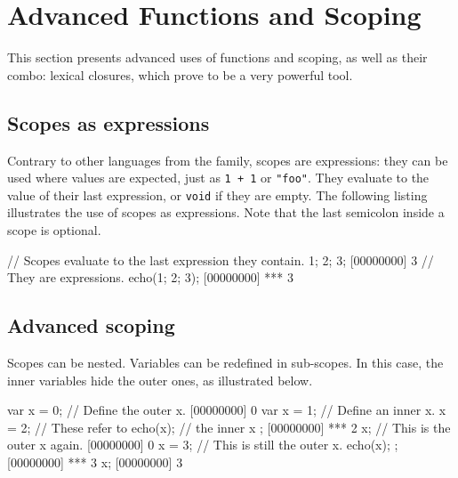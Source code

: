 
\chapter{Advanced Functions and Scoping}
\label{sec:tut:function}

This section presents advanced uses of functions and scoping, as well
as their combo: lexical closures, which prove to be a very powerful
tool.

\section{Scopes as expressions}

Contrary to other languages from the \C family, scopes are
expressions: they can be used where values are expected, just as
\lstinline|1 + 1| or \lstinline|"foo"|.
They evaluate to the value of their last expression, or
\lstinline|void| if they are
empty. The following listing illustrates the use of scopes as
expressions. Note that the last semicolon inside a scope is optional.

\begin{urbiscript}[firstnumber=1]
// Scopes evaluate to the last expression they contain.
{ 1; 2; 3};
[00000000] 3
// They are expressions.
echo({1; 2; 3});
[00000000] *** 3
\end{urbiscript}

\section{Advanced scoping}

Scopes can be nested. Variables can be redefined in sub-scopes. In
this case, the inner variables hide the outer ones, as illustrated
below.

\begin{urbiscript}
var x = 0;   // Define the outer x.
[00000000] 0
{
  var x = 1; // Define an inner x.
  x = 2;     // These refer to
  echo(x);   // the inner x
};
[00000000] *** 2
x;           // This is the outer x again.
[00000000] 0
{
  x = 3;     // This is still the outer x.
  echo(x);
};
[00000000] *** 3
x;
[00000000] 3
\end{urbiscript}

